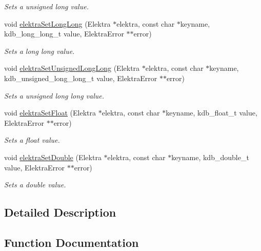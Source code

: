 \begin{DoxyCompactItemize}
\begin{DoxyCompactList}\small\item\em Sets a unsigned long value. \end{DoxyCompactList}\item 
void \mbox{\hyperlink{group__highlevel_gaa91c0a9b907afdb1f8b202804be36f6f}{elektra\+Set\+Long\+Long}} (Elektra $\ast$elektra, const char $\ast$keyname, kdb\+\_\+long\+\_\+long\+\_\+t value, Elektra\+Error $\ast$$\ast$error)
\begin{DoxyCompactList}\small\item\em Sets a long long value. \end{DoxyCompactList}\item 
void \mbox{\hyperlink{group__highlevel_ga4aba418539ac27449193b8f8cb761734}{elektra\+Set\+Unsigned\+Long\+Long}} (Elektra $\ast$elektra, const char $\ast$keyname, kdb\+\_\+unsigned\+\_\+long\+\_\+long\+\_\+t value, Elektra\+Error $\ast$$\ast$error)
\begin{DoxyCompactList}\small\item\em Sets a unsigned long long value. \end{DoxyCompactList}\item 
void \mbox{\hyperlink{group__highlevel_gae9f490191adb55639c70501e1ca3fbe8}{elektra\+Set\+Float}} (Elektra $\ast$elektra, const char $\ast$keyname, kdb\+\_\+float\+\_\+t value, Elektra\+Error $\ast$$\ast$error)
\begin{DoxyCompactList}\small\item\em Sets a float value. \end{DoxyCompactList}\item 
void \mbox{\hyperlink{group__highlevel_ga803c1b5131516de24bc81c94aca44bbd}{elektra\+Set\+Double}} (Elektra $\ast$elektra, const char $\ast$keyname, kdb\+\_\+double\+\_\+t value, Elektra\+Error $\ast$$\ast$error)
\begin{DoxyCompactList}\small\item\em Sets a double value. \end{DoxyCompactList}\end{DoxyCompactItemize}


\subsection{Detailed Description}


\subsection{Function Documentation}
\mbox{\label{group__highlevel_gaf0413286c6faebdc951b739924111909}} 
